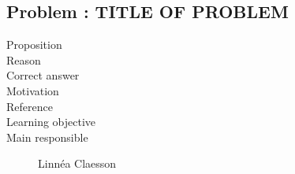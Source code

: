 \documentclass[10pt,a4paper]{article}
\begin{document}
\subsection*{Problem : TITLE OF PROBLEM}
\begin{description}
\item[Proposition] 
\item[Reason] 
\item[Correct answer]
\item[Motivation]
\item[Reference]
\item[Learning objective]
\item[Main responsible] Linn\'ea Claesson
\end{description}
\end{document}
